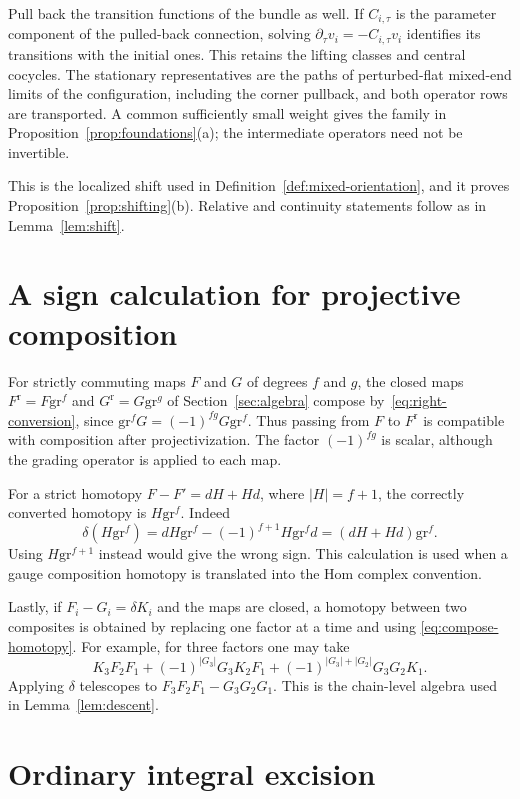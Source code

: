 \documentclass[11pt]{amsart}
\theoremstyle{definition}
\theoremstyle{remark}
\theoremstyle{plain}
\numberwithin{equation}{section}
\newcommand{\eps}{\mathrm{gr}}
\begin{document}
Pull back the transition functions of the bundle as well. If
$C_{i,\tau}$ is the parameter component of the pulled-back connection,
solving $\partial_\tau v_i=-C_{i,\tau}v_i$ identifies its transitions
with the initial ones. This retains the lifting classes and central
cocycles. The stationary representatives are the paths of
perturbed-flat mixed-end limits of the configuration, including the
corner pullback, and both operator rows are transported. A common
sufficiently small weight gives the family in
Proposition~\ref{prop:foundations}(a); the intermediate operators need
not be invertible.

This is the localized shift used in
Definition~\ref{def:mixed-orientation}, and it
proves Proposition~\ref{prop:shifting}(b). Relative and continuity statements
follow as in Lemma~\ref{lem:shift}.

\section{A sign calculation for projective composition}\label{app:signs}

For strictly commuting maps $F$ and $G$ of
degrees $f$ and $g$, the closed maps
$F^{\mathrm r}=F\eps^f$ and $G^{\mathrm r}=G\eps^g$
of Section~\ref{sec:algebra} compose
by~\eqref{eq:right-conversion}, since
$\eps^fG=(-1)^{fg}G\eps^f$. Thus passing from
$F$ to $F^{\mathrm r}$ is compatible with
composition after projectivization. The factor
$(-1)^{fg}$ is scalar, although the grading
operator is applied to each map.

For a strict homotopy
$F-F'=dH+Hd$, where
$|H|=f+1$, the correctly
converted homotopy is
$H\eps^f$. Indeed
\[
 \delta(H\eps^f)
 =dH\eps^f-(-1)^{f+1}H\eps^fd
 =(dH+Hd)\eps^f.
\]
Using $H\eps^{f+1}$ instead
would give the wrong sign.
This calculation is used
when a gauge
composition homotopy is
translated into the Hom
complex convention.

Lastly, if
$F_i-G_i=\delta K_i$ and
the maps are closed,
a homotopy between two
composites is obtained
by replacing one factor
at a time and using
\eqref{eq:compose-homotopy}.
For example, for three
factors one may take
\[
 K_3F_2F_1
 +(-1)^{|G_3|}G_3K_2F_1
 +(-1)^{|G_3|+|G_2|}G_3G_2K_1.
\]
Applying $\delta$ telescopes
to $F_3F_2F_1-G_3G_2G_1$.
This is the chain-level
algebra used in
Lemma~\ref{lem:descent}.

\section{Ordinary integral excision}\label{app:selfgluing}
\end{document}
